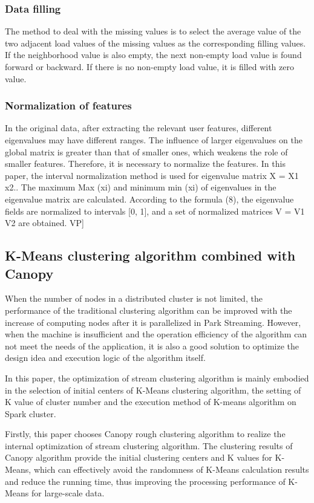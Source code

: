 \documentclass[runningheads]{llncs}
\begin{document}
\subsubsection{Data filling}
The method to deal with the missing values is to select the average value of the two adjacent load values of the missing values as the corresponding filling values. If the neighborhood value is also empty, the next non-empty load value is found forward or backward. If there is no non-empty load value, it is filled with zero value.
\subsubsection{Normalization of features}
In the original data, after extracting the relevant user features, different eigenvalues may have different ranges. The influence of larger eigenvalues on the global matrix is greater than that of smaller ones, which weakens the role of smaller features. Therefore, it is necessary to normalize the features. In this paper, the interval normalization method is used for eigenvalue matrix X = X1 x2.. The maximum Max (xi) and minimum min (xi) of eigenvalues in the eigenvalue matrix are calculated. According to the formula (8), the eigenvalue fields are normalized to intervals [0, 1], and a set of normalized matrices V = V1 V2 are obtained. VP]
\subsection{K-Means clustering algorithm combined with Canopy}
When the number of nodes in a distributed cluster is not limited, the performance of the traditional clustering algorithm can be improved with the increase of computing nodes after it is parallelized in Park Streaming. However, when the machine is insufficient and the operation efficiency of the algorithm can not meet the needs of the application, it is also a good solution to optimize the design idea and execution logic of the algorithm itself.

In this paper, the optimization of stream clustering algorithm is mainly embodied in the selection of initial centers of K-Means clustering algorithm, the setting of K value of cluster number and the execution method of K-means algorithm on Spark cluster.

Firstly, this paper chooses Canopy rough clustering algorithm to realize the internal optimization of stream clustering algorithm. The clustering results of Canopy algorithm provide the initial clustering centers and K values for K-Means, which can effectively avoid the randomness of K-Means calculation results and reduce the running time, thus improving the processing performance of K-Means for large-scale data.
\end{document}
